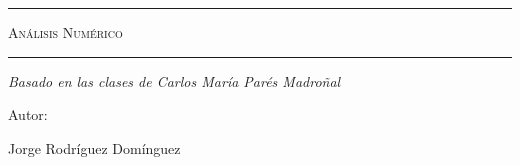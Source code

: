\begin{titlepage}
\centering
{\bfseries\LARGE \ \par}
\vspace{1cm}
{\scshape\Large \ \par}
\vspace{3cm}
\rule{\linewidth}{0.5mm}
{\scshape\Huge Análisis Numérico \par}
\rule{\linewidth}{0.5mm} \par
\vspace{3cm}
{\itshape\Large Basado en las clases de Carlos María Parés Madroñal \par}
\vfill
{\Large Autor: \par}
{\Large Jorge Rodríguez Domínguez \par}
\vfill
\end{titlepage}
\tableofcontents